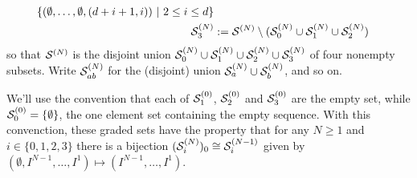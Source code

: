 \documentclass[10pt]{article}
\begin{document}
\begin{CalculatingRepeatedKoszul}
\begin{alignat*}{2}
\{(\emptyset,\ldots,\emptyset,(d+i+1,i))\ |\ 2\leq i\leq d\}\\
\mathcal{S}^{(N)}_3&:=\mathcal{S}^{(N)}\setminus(\mathcal{S}^{(N)}_0 \cup\mathcal{S}^{(N)}_1\cup \mathcal{S}^{(N)}_2)
\end{alignat*}
so that $\mathcal{S}^{(N)}$ is the disjoint union $\mathcal{S}^{(N)}_0\cup\mathcal{S}^{(N)}_1\cup\mathcal{S}^{(N)}_2\cup\mathcal{S}^{(N)}_3$ of four nonempty subsets. Write $\mathcal{S}^{(N)}_{ab}$ for the (disjoint) union $\mathcal{S}^{(N)}_{a}\cup\mathcal{S}^{(N)}_{b}$, and so on.

We'll use the convention that each of $\mathcal{S}^{(0)}_1$, $\mathcal{S}^{(0)}_2$ and $\mathcal{S}^{(0)}_3$ are the empty set, while $\mathcal{S}^{(0)}_0=\{\emptyset\}$, the one element set containing the empty sequence.
With this convenction, these graded sets have the property that for any $N\geq1$ and $i\in\{0,1,2,3\}$ there is a bijection $(\mathcal{S}^{(N)}_i)_0\cong\mathcal{S}^{(N-1)}_i$ given by $(\emptyset,I^{N-1},\ldots,I^1)\mapsto(I^{N-1},\ldots,I^1)$.



\end{CalculatingRepeatedKoszul}
\end{document}
